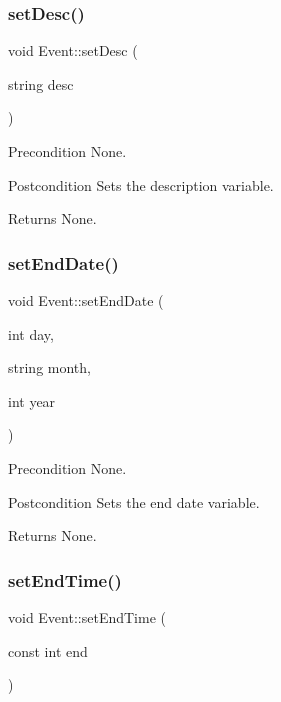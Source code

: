 \subsubsection{\texorpdfstring{set\+Desc()}{setDesc()}}
{\footnotesize\ttfamily void Event\+::set\+Desc (\begin{DoxyParamCaption}\item[{string}]{desc }\end{DoxyParamCaption})}

\begin{DoxyPrecond}{Precondition}
None. 
\end{DoxyPrecond}
\begin{DoxyPostcond}{Postcondition}
Sets the description variable. 
\end{DoxyPostcond}
\begin{DoxyReturn}{Returns}
None. 
\end{DoxyReturn}
\hypertarget{class_event_a0a0628267e9bbb4314f7e9aea5003fe4}{}\label{class_event_a0a0628267e9bbb4314f7e9aea5003fe4} 
\subsubsection{\texorpdfstring{set\+End\+Date()}{setEndDate()}}
{\footnotesize\ttfamily void Event\+::set\+End\+Date (\begin{DoxyParamCaption}\item[{int}]{day,  }\item[{string}]{month,  }\item[{int}]{year }\end{DoxyParamCaption})}

\begin{DoxyPrecond}{Precondition}
None. 
\end{DoxyPrecond}
\begin{DoxyPostcond}{Postcondition}
Sets the end date variable. 
\end{DoxyPostcond}
\begin{DoxyReturn}{Returns}
None. 
\end{DoxyReturn}
\hypertarget{class_event_a03cd2f48f92276e528ab6e7eba3d6000}{}\label{class_event_a03cd2f48f92276e528ab6e7eba3d6000} 
\subsubsection{\texorpdfstring{set\+End\+Time()}{setEndTime()}}
{\footnotesize\ttfamily void Event\+::set\+End\+Time (\begin{DoxyParamCaption}\item[{const int}]{end }\end{DoxyParamCaption})}

